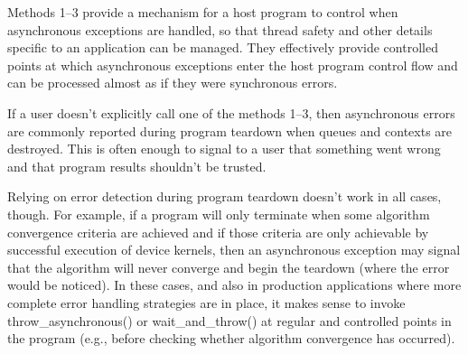 Methods 1–3 provide a mechanism for a host program to control when asynchronous exceptions are handled, so that thread safety and other details specific to an application can be managed. They effectively provide controlled points at which asynchronous exceptions enter the host program control flow and can be processed almost as if they were synchronous errors.\par

If a user doesn’t explicitly call one of the methods 1–3, then asynchronous errors are commonly reported during program teardown when queues and contexts are destroyed. This is often enough to signal to a user that something went wrong and that program results shouldn’t be trusted.\par

Relying on error detection during program teardown doesn’t work in all cases, though. For example, if a program will only terminate when some algorithm convergence criteria are achieved and if those criteria are only achievable by successful execution of device kernels, then an asynchronous exception may signal that the algorithm will never converge and begin the teardown (where the error would be noticed). In these cases, and also in production applications where more complete error handling strategies are in place, it makes sense to invoke throw\_asynchronous() or wait\_and\_throw() at regular and controlled points in the program (e.g., before checking whether algorithm convergence has occurred).\par



















